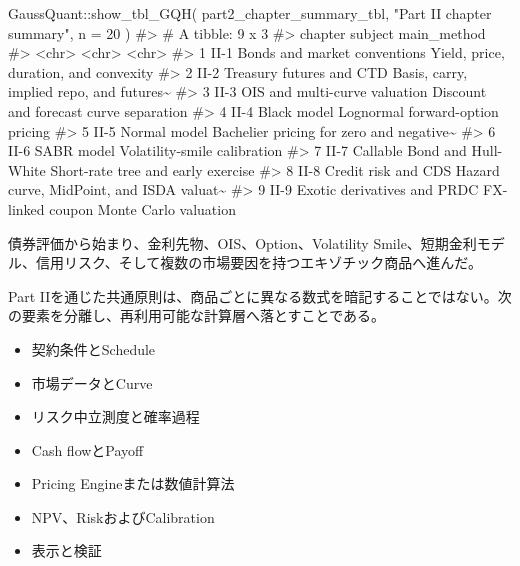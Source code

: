 \documentclass[
  letterpaper,
  DIV=11,
  numbers=noendperiod]{scrreprt}
\newenvironment{Shaded}{\begin{snugshade}}{\end{snugshade}}
\newcommand{\AttributeTok}[1]{\textcolor[rgb]{0.40,0.45,0.13}{#1}}
\newcommand{\CommentTok}[1]{\textcolor[rgb]{0.37,0.37,0.37}{#1}}
\newcommand{\DecValTok}[1]{\textcolor[rgb]{0.68,0.00,0.00}{#1}}
\newcommand{\FunctionTok}[1]{\textcolor[rgb]{0.28,0.35,0.67}{#1}}
\newcommand{\NormalTok}[1]{\textcolor[rgb]{0.00,0.23,0.31}{#1}}
\newcommand{\SpecialCharTok}[1]{\textcolor[rgb]{0.37,0.37,0.37}{#1}}
\newcommand{\StringTok}[1]{\textcolor[rgb]{0.13,0.47,0.30}{#1}}
\providecommand{\tightlist}{%
  \setlength{\itemsep}{0pt}\setlength{\parskip}{0pt}}
\begin{document}
\begin{Shaded}
\begin{Highlighting}[]
\NormalTok{GaussQuant}\SpecialCharTok{::}\FunctionTok{show\_tbl\_GQH}\NormalTok{(}
\NormalTok{  part2\_chapter\_summary\_tbl,}
  \StringTok{"Part II chapter summary"}\NormalTok{,}
  \AttributeTok{n =} \DecValTok{20}
\NormalTok{)}
\CommentTok{\#\textgreater{} \# A tibble: 9 x 3}
\CommentTok{\#\textgreater{}   chapter subject                       main\_method                             }
\CommentTok{\#\textgreater{}   \textless{}chr\textgreater{}   \textless{}chr\textgreater{}                         \textless{}chr\textgreater{}                                   }
\CommentTok{\#\textgreater{} 1 II{-}1    Bonds and market conventions  Yield, price, duration, and convexity   }
\CommentTok{\#\textgreater{} 2 II{-}2    Treasury futures and CTD      Basis, carry, implied repo, and futures\textasciitilde{}}
\CommentTok{\#\textgreater{} 3 II{-}3    OIS and multi{-}curve valuation Discount and forecast curve separation  }
\CommentTok{\#\textgreater{} 4 II{-}4    Black model                   Lognormal forward{-}option pricing        }
\CommentTok{\#\textgreater{} 5 II{-}5    Normal model                  Bachelier pricing for zero and negative\textasciitilde{}}
\CommentTok{\#\textgreater{} 6 II{-}6    SABR model                    Volatility{-}smile calibration            }
\CommentTok{\#\textgreater{} 7 II{-}7    Callable Bond and Hull{-}White  Short{-}rate tree and early exercise      }
\CommentTok{\#\textgreater{} 8 II{-}8    Credit risk and CDS           Hazard curve, MidPoint, and ISDA valuat\textasciitilde{}}
\CommentTok{\#\textgreater{} 9 II{-}9    Exotic derivatives and PRDC   FX{-}linked coupon Monte Carlo valuation}
\end{Highlighting}
\end{Shaded}

債券評価から始まり、金利先物、OIS、Option、Volatility
Smile、短期金利モデル、信用リスク、そして複数の市場要因を持つエキゾチック商品へ進んだ。

Part
IIを通じた共通原則は、商品ごとに異なる数式を暗記することではない。次の要素を分離し、再利用可能な計算層へ落とすことである。

\begin{itemize}
\tightlist
\item
  契約条件とSchedule
\item
  市場データとCurve
\item
  リスク中立測度と確率過程
\item
  Cash flowとPayoff
\item
  Pricing Engineまたは数値計算法
\item
  NPV、RiskおよびCalibration
\item
  表示と検証
\end{itemize}
\end{document}
